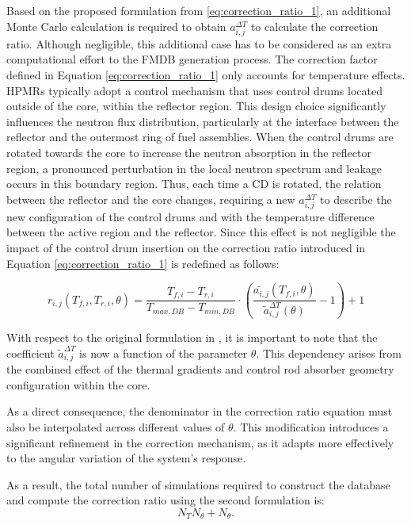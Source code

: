 \documentclass[preprint,review,12pt]{elsarticle}
\begin{document}
Based on the proposed formulation from \cref{eq:correction_ratio_1}, an additional Monte Carlo calculation is required to obtain $a_{i,j}^{\Delta T}$ to calculate the correction ratio. Although negligible, this additional case has to be considered as an extra computational effort to the FMDB generation process.  
The correction factor defined in Equation \cref{eq:correction_ratio_1} only accounts for temperature effects. HPMRs typically adopt a control mechanism that uses control drums located outside of the core, within the reflector region. This design choice significantly influences the neutron flux distribution, particularly at the interface between the reflector and the outermost ring of fuel assemblies. When the control drums are rotated towards the core to increase the neutron absorption in the reflector region, a pronounced perturbation in the local neutron spectrum and leakage occurs in this boundary region. Thus, each time a CD is rotated, the relation between the reflector and the core changes, requiring a new $a_{i,j}^{\Delta T}$ to describe the new configuration of the control drums and with the temperature difference between the active region and the reflector. 
Since this effect is not negligible the impact of the control drum insertion on the correction ratio introduced in Equation \cref{eq:correction_ratio_1} is redefined as follows:    

\begin{equation}
r_{i,j}(T_{f,i}, T_{r,i}, \theta) = \frac{T_{f,i} - T_{r,i}}{T_{max,DB} - T_{min,DB}} \cdot \left( \frac{ \tilde{a_{i,j}}(T_{f,i}, \theta)}{\tilde{a}_{i,j}^{\Delta T}(\theta)} - 1 \right) + 1
\label{eq:correction_ratio_2}
\end{equation}

With respect to the original formulation in , it is important to note that the coefficient $\tilde{a}_{i,j}^{\Delta T}$ is now a function of the parameter $\theta$. This dependency arises from the combined effect of the thermal gradients and control rod absorber geometry configuration within the core.

As a direct consequence, the denominator in the correction ratio equation must also be interpolated across different values of $\theta$. This modification introduces a significant refinement in the correction mechanism, as it adapts more effectively to the angular variation of the system’s response.

As a result, the total number of simulations required to construct the database and compute the correction ratio using the second formulation is:
\begin{equation}
    N_T N_{\theta} + N_{\theta}.
\end{equation}
\end{document}
